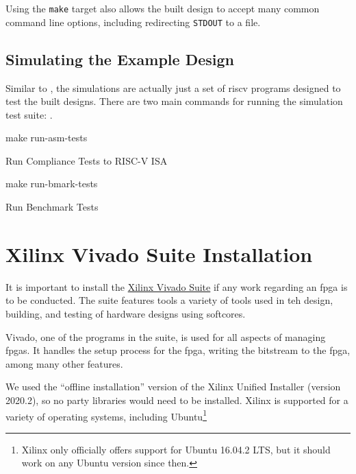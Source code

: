 Using the \texttt{make} target also allows the built design to accept many common command line options, including redirecting \texttt{STDOUT} to a file.

\subsection{Simulating the Example Design}\label{sec:Simulating_Example_Design}
Similar to , the simulations are actually just a set of \Gls{riscv} programs designed to test the built designs.
There are two main commands for running the simulation test suite: .

\begin{listing}[h!tbp]
\begin{bashsource}
make run-asm-tests
\end{bashsource}
\caption{Run Compliance Tests to RISC-V ISA}
\label{lst:ASM_Tests}
\end{listing}

\begin{listing}[h!tbp]
\begin{bashsource}
make run-bmark-tests
\end{bashsource}
\caption{Run Benchmark Tests}
\label{lst:Run_Benchmark_Tests}
\end{listing}

\section{Xilinx Vivado Suite Installation}\label{sec:Xilinx_Vivado_Suide_Install}
It is important to install the \href{https://www.xilinx.com/support/download.html}{Xilinx Vivado Suite} if any work regarding an \Gls{fpga} is to be conducted.
The suite features tools a variety of tools used in teh design, building, and testing of hardware designs using \glspl{softcore}.

Vivado, one of the programs in the suite, is used for all aspects of managing \Glspl{fpga}.
It handles the setup process for the \Gls{fpga}, writing the bitstream to the \Gls{fpga}, among many other features.

We used the ``offline installation'' version of the Xilinx Unified Installer (version 2020.2), so no  party libraries would need to be installed.
Xilinx is supported for a variety of operating systems, including Ubuntu\footnote{Xilinx only officially offers support for Ubuntu 16.04.2 LTS, but it should work on any Ubuntu version since then.}


